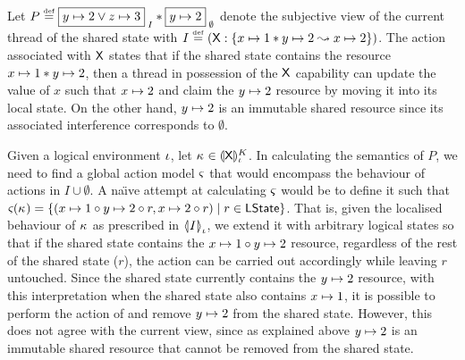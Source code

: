 \begin{example}[]\label{ex:closure}
Let $P \eqdef \shared{\cell{y}{2} \lor \cell{z}{3}}{I} * \shared{\cell{y}{2}}{\emptyset}$ denote the subjective view of the current thread of the shared state with $I \eqdef (\token{X}: \left\{\cell{x}{1} * \cell{y}{2} \swap \cell{x}{2}\right\})$. The action associated with $\token{X}$ states that if the shared state contains the resource $\cell{x}{1} * \cell{y}{2}$, then a thread in possession of the $\token{X}$ capability can update the value of $x$ such that $\cell{x}{2}$ and claim the $\cell{y}{2}$ resource by moving it into its local state. On the other hand, $\cell{y}{2}$ is an immutable shared resource since its associated interference corresponds to $\emptyset$.

Given a logical environment $\lenv$, let $\ca{} \in \semK[\lenv]{\token{X}}$. In calculating the semantics of $P$, we need to find a global action model $\amod{}$ that would encompass the behaviour of actions in $I \cup \emptyset$. A na\"\i ve attempt at calculating $\amod{}$ would be to define it such that $\amod{}(\ca{}) = \left\{(\cell{x}{1} \composeL \cell{y}{2} \composeL r, \cell{x}{2} \composeL r ) \mid r \in \LStates \right\}$. That is, given the localised behaviour of $\ca{}$ as prescribed in $\semI[\lenv]{I}$, we extend it with arbitrary logical states so that if the shared state contains the $\cell{x}{1} \composeL \cell{y}{2}$ resource, regardless of the rest of the shared state ($r$), the action can be carried out accordingly while leaving $r$ untouched. Since the shared state currently contains the $\cell{y}{2}$ resource, with this interpretation when the shared state also contains $\cell{x}{1}$, it is possible to perform the action of  and remove $\cell{y}{2}$ from the shared state. However, this does not agree with the current view, since as explained above $\cell{y}{2}$ is an immutable shared resource that cannot be removed from the shared state. 
%
\end{example}
